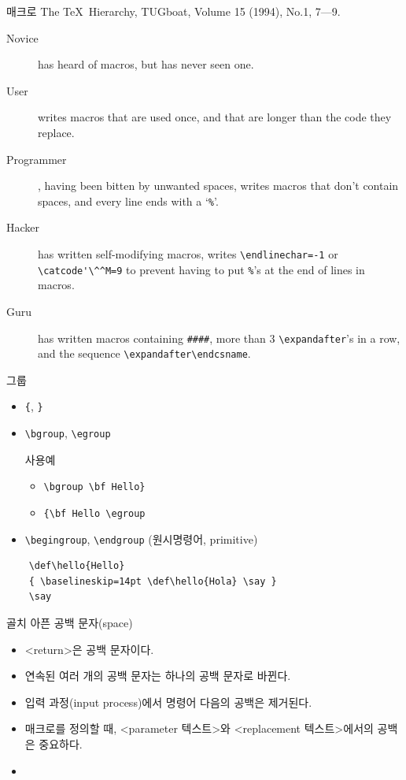 \documentclass{beamer}
\begin{document}
%
\begin{frame}[fragile]{매크로}
  The \TeX\ Hierarchy, TUGboat, Volume 15 (1994), No.1, 7---9.
  \begin{description}
  \item [Novice] has heard of macros, but has never seen one.
  \item [User] writes macros that are used once, and that are
    longer than the code they replace.
  \item [Programmer], having been bitten by unwanted spaces,
    writes macros that don't contain spaces, and every line ends with
    a `{\small\verb+%+}'.
  \item [Hacker] has written self-modifying macros, writes
    {\small\verb+\endlinechar=-1+} or {\small\verb+\catcode'\^^M=9+}
    to prevent having to put {\small\verb+%+}'s at the end of lines in macros.
  \item [Guru] has written macros containing {\small\verb+####+}, more than 3
    {\small\verb+\expandafter+}'s in a row, and the sequence
    {\small\verb+\expandafter\endcsname+}.
  \end{description}
\end{frame}


%
\begin{frame}[fragile]{그룹}
  \begin{itemize}
  \item \verb+{+, \verb+}+
  \item \verb+\bgroup+, \verb+\egroup+
    \begin{exampleblock}{사용예}
      \begin{itemize}
      \item \verb+\bgroup \bf Hello}+
      \item \verb+{\bf Hello \egroup+
      \end{itemize}
    \end{exampleblock}
  \item \verb+\begingroup+, \verb+\endgroup+ (원시명령어, primitive)
  \end{itemize}

  \begin{verbatim}
    \def\hello{Hello}
    { \baselineskip=14pt \def\hello{Hola} \say }
    \say
  \end{verbatim}
\end{frame}


%
\begin{frame}{골치 아픈 공백 문자(space)}
  \begin{itemize}
  \item <return>은 공백 문자이다.
  \item 연속된 여러 개의 공백 문자는 하나의 공백 문자로 바뀐다.
  \item 입력 과정(input process)에서 명령어 다음의 공백은 제거된다.
  \item 매크로를 정의할 때, <parameter 텍스트>와 <replacement 텍스트>에서의
    공백은 중요하다.
  \item  
  \end{itemize}
\end{frame}
\end{document}
